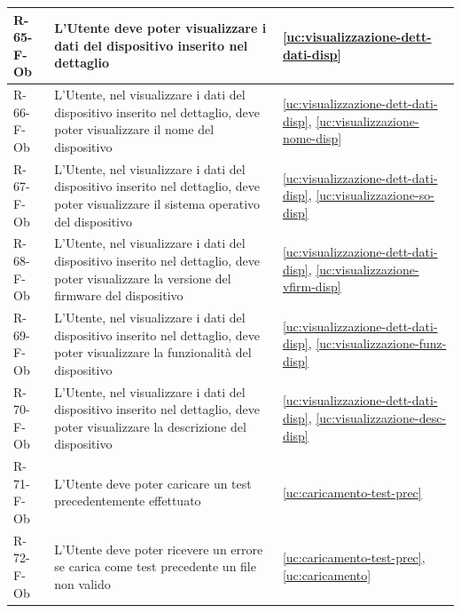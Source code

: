 ﻿\documentclass[a4paper,12pt]{article}
\begin{document}
{{\begin{longtable}{|l|p{}|p{}|}
            R-65-F-Ob       & L'Utente deve poter visualizzare i dati del dispositivo inserito nel dettaglio                                                                                                              & \ref{uc:visualizzazione-dett-dati-disp}                                               \\ \hline
            R-66-F-Ob       & L'Utente, nel visualizzare i dati del dispositivo inserito nel dettaglio, deve poter visualizzare il nome del dispositivo                                                                   & \ref{uc:visualizzazione-dett-dati-disp}, \ref{uc:visualizzazione-nome-disp}                 \\ \hline
            R-67-F-Ob       & L'Utente, nel visualizzare i dati del dispositivo inserito nel dettaglio, deve poter visualizzare il sistema operativo del dispositivo                                                      & \ref{uc:visualizzazione-dett-dati-disp}, \ref{uc:visualizzazione-so-disp}                 \\ \hline
            R-68-F-Ob       & L'Utente, nel visualizzare i dati del dispositivo inserito nel dettaglio, deve poter visualizzare la versione del firmware del dispositivo                                                  & \ref{uc:visualizzazione-dett-dati-disp}, \ref{uc:visualizzazione-vfirm-disp}                 \\ \hline
            R-69-F-Ob       & L'Utente, nel visualizzare i dati del dispositivo inserito nel dettaglio, deve poter visualizzare la funzionalità del dispositivo                                                           & \ref{uc:visualizzazione-dett-dati-disp}, \ref{uc:visualizzazione-funz-disp}                 \\ \hline
            R-70-F-Ob       & L'Utente, nel visualizzare i dati del dispositivo inserito nel dettaglio, deve poter visualizzare la descrizione del dispositivo                                                            & \ref{uc:visualizzazione-dett-dati-disp}, \ref{uc:visualizzazione-desc-disp}                 \\ \hline
            R-71-F-Ob       & L'Utente deve poter caricare un test precedentemente effettuato                                                                                                                             & \ref{uc:caricamento-test-prec}                                               \\ \hline
            R-72-F-Ob       & L'Utente deve poter ricevere un errore se carica come test precedente un file non valido                                                                                                    & \ref{uc:caricamento-test-prec}, \ref{uc:caricamento}                       \\ \hline

\end{longtable}}}
\end{document}
